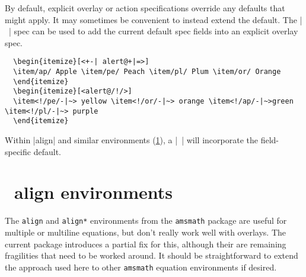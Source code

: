 \documentclass[a4paper]{ltxdoc}
\begin{document}
By default, explicit overlay or action specifications override any defaults that
might apply.  It may sometimes be convenient to instead extend the default.  The
|~| spec can be used to add the current default spec fields into an explicit
overlay spec.
\example
\begin{verbatim}
  \begin{itemize}[<+-| alert@+|=>]
  \item/ap/ Apple \item/pe/ Peach \item/pl/ Plum \item/or/ Orange
  \end{itemize}
  \begin{itemize}[<alert@/!/>]
  \item<!/pe/-|~> yellow \item<!/or/-|~> orange \item<!/ap/-|~>green \item<!/pl/-|~> purple
  \end{itemize}
\end{verbatim}
Within |align| and similar environments (\cref{sec:ams}), a |~| will incorporate
the field-specific default.



\section{\AmSTeX\ align environments}\label{sec:ams}

The \texttt{align} and \texttt{align*} environments from the \texttt{amsmath}
package are useful for multiple or multiline equations, but don't really work
well with overlays.  The current package introduces a partial fix for this,
although their are remaining fragilities that need to be worked around.  It
should be straightforward to extend the approach used here to other
\texttt{amsmath} equation environments if desired.
\end{document}
